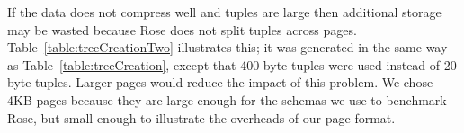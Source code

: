 \documentclass{vldb}
\newcommand{\rows}{Rose\xspace}
\newcommand{\rowss}{Rose's\xspace}
\begin{document}
If the data does not compress well and tuples are large then additional
storage may be wasted because \rows does not split tuples across
pages.  Table~\ref{table:treeCreationTwo} illustrates this; it was
generated in the same way as Table~\ref{table:treeCreation}, except
that 400 byte tuples were used instead of 20 byte tuples.  Larger
pages would reduce the impact of this problem.  We chose 4KB pages
because they are large enough for the schemas we use to benchmark
\rows, but small enough to illustrate the overheads of our page
format.






\end{document}
